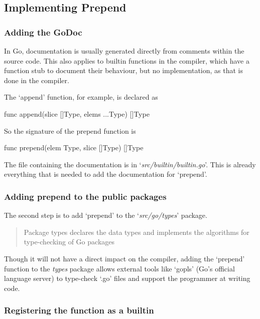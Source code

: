 \subsection{Implementing Prepend}

\subsubsection{Adding the GoDoc}
In Go, documentation is usually generated directly from comments within the source code\cite{godoc}. This also applies to
builtin functions in the compiler, which have a function stub to document their behaviour\cite{godoc-builtin},
but no implementation, as that is done in the compiler\cite{builtin-impl}.

The `append' function, for example, is declared as
\begin{gocode}
func append(slice []Type, elems ...Type) []Type
\end{gocode}

So the signature of the prepend function is
\begin{gocode}
func prepend(elem Type, slice []Type) []Type
\end{gocode}

The file containing the documentation is in `\textit{src/builtin/builtin.go}'.
This is already everything that is needed to add the documentation for `prepend'.

\subsubsection{Adding prepend to the public packages}

The second step is to add `prepend' to the `\textit{src/go/types}' package.
\begin{quote}
    Package types declares the data types and implements the algorithms for
    type-checking of Go packages
\end{quote}\cite{godoc-types}

Though it will not have a direct impact on the compiler, adding the `prepend' function
to the \textit{types} package allows external tools like `gopls' (Go's official language server)\cite{gopls} to type-check `.go' files and support the programmer
at writing code.

\subsubsection{Registering the function as a builtin}


